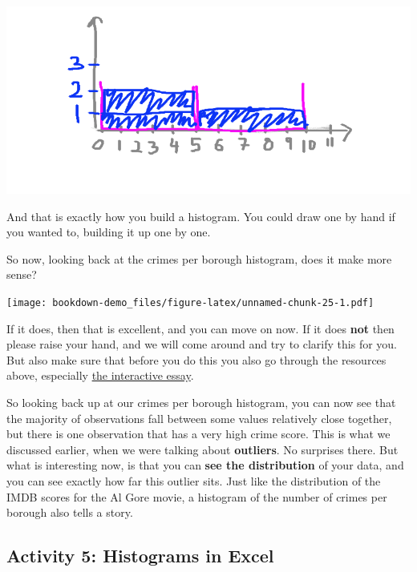 \documentclass[]{book}
\theoremstyle{definition}
\theoremstyle{definition}
\theoremstyle{definition}
\theoremstyle{remark}
\begin{document}
\includegraphics{imgs/hist_fill_3.png}

And that is exactly how you build a histogram. You could draw one by
hand if you wanted to, building it up one by one.

So now, looking back at the crimes per borough histogram, does it make
more sense?

\texttt{[image: bookdown-demo\_files/figure-latex/unnamed-chunk-25-1.pdf]}

If it does, then that is excellent, and you can move on now. If it does
\textbf{not} then please raise your hand, and we will come around and
try to clarify this for you. But also make sure that before you do this
you also go through the resources above, especially
\href{http://tinlizzie.org/histograms/}{the interactive essay}.

So looking back up at our crimes per borough histogram, you can now see
that the majority of observations fall between some values relatively
close together, but there is one observation that has a very high crime
score. This is what we discussed earlier, when we were talking about
\textbf{outliers}. No surprises there. But what is interesting now, is
that you can \textbf{see the distribution} of your data, and you can see
exactly how far this outlier sits. Just like the distribution of the
IMDB scores for the Al Gore movie, a histogram of the number of crimes
per borough also tells a story.

\hypertarget{activity-5-histograms-in-excel}{%
\subsection{Activity 5: Histograms in
Excel}\label{activity-5-histograms-in-excel}}
\end{document}
